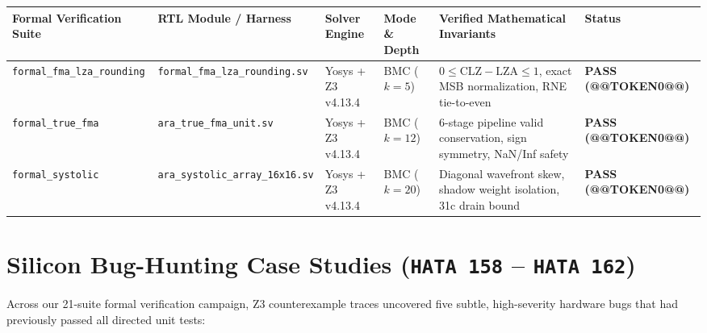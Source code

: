 \documentclass[journal,10pt,twocolumn]{IEEEtran}
\begin{document}
\begin{table}[htbp]
\centering\footnotesize
\begin{tabular}{p{} p{} p{} p{} p{} p{}}
\toprule
\textbf{Formal Verification Suite} & \textbf{RTL Module / Harness} & \textbf{Solver Engine} & \textbf{Mode \& Depth} & \textbf{Verified Mathematical Invariants} & \textbf{Status} \\
\midrule
\texttt{formal\_fma\_lza\_rounding} & \texttt{formal\_fma\_lza\_rounding.sv} & Yosys + Z3 v4.13.4 & BMC ($k=5$) & $0 \le \mathrm{CLZ}-\mathrm{LZA} \le 1$, exact MSB normalization, RNE tie-to-even & \textbf{PASS (@@TOKEN0@@)} \\
\texttt{formal\_true\_fma} & \texttt{ara\_true\_fma\_unit.sv} & Yosys + Z3 v4.13.4 & BMC ($k=12$) & 6-stage pipeline valid conservation, sign symmetry, NaN/Inf safety & \textbf{PASS (@@TOKEN0@@)} \\
\texttt{formal\_systolic} & \texttt{ara\_systolic\_array\_16x16.sv} & Yosys + Z3 v4.13.4 & BMC ($k=20$) & Diagonal wavefront skew, shadow weight isolation, 31c drain bound & \textbf{PASS (@@TOKEN0@@)} \\
\bottomrule
\end{tabular}
\vspace{4pt}
\end{table}


\section{Silicon Bug-Hunting Case Studies (\texttt{HATA 158} – \texttt{HATA 162})}

Across our 21-suite formal verification campaign, Z3 counterexample traces uncovered five subtle, high-severity hardware bugs that had previously passed all directed unit tests:
\end{document}
